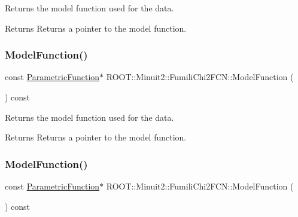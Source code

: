 Returns the model function used for the data.

\begin{DoxyReturn}{Returns}
Returns a pointer to the model function. 
\end{DoxyReturn}
\mbox{\label{classROOT_1_1Minuit2_1_1FumiliChi2FCN_a3d31739e476a413e0c5616bb0c6283b9}} 
\subsubsection{\texorpdfstring{ModelFunction()}{ModelFunction()}\hspace{0.1cm}{\footnotesize\ttfamily [2/3]}}
{\footnotesize\ttfamily const \mbox{\hyperlink{classROOT_1_1Minuit2_1_1ParametricFunction}{Parametric\+Function}}$\ast$ R\+O\+O\+T\+::\+Minuit2\+::\+Fumili\+Chi2\+F\+C\+N\+::\+Model\+Function (\begin{DoxyParamCaption}{ }\end{DoxyParamCaption}) const\hspace{0.3cm}{\ttfamily [inline]}}

Returns the model function used for the data.

\begin{DoxyReturn}{Returns}
Returns a pointer to the model function. 
\end{DoxyReturn}
\mbox{\label{classROOT_1_1Minuit2_1_1FumiliChi2FCN_a3d31739e476a413e0c5616bb0c6283b9}} 
\subsubsection{\texorpdfstring{ModelFunction()}{ModelFunction()}\hspace{0.1cm}{\footnotesize\ttfamily [3/3]}}
{\footnotesize\ttfamily const \mbox{\hyperlink{classROOT_1_1Minuit2_1_1ParametricFunction}{Parametric\+Function}}$\ast$ R\+O\+O\+T\+::\+Minuit2\+::\+Fumili\+Chi2\+F\+C\+N\+::\+Model\+Function (\begin{DoxyParamCaption}{ }\end{DoxyParamCaption}) const\hspace{0.3cm}{\ttfamily [inline]}}

